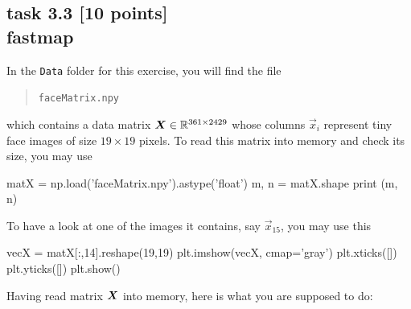 
\subsection*{task 3.3 [10 points] \\[1ex] fastmap}

In the \texttt{Data} folder for this exercise, you will find the file
\begin{quote}
    \texttt{faceMatrix.npy}
\end{quote}
which contains a data matrix $\bm{X} \in \mathbb{R}^{361 \times 2429}$ whose columns $\vec{x}_i$ represent tiny face images of size $19 \times 19$ pixels. To read this matrix into memory and check its size, you may use
\begin{python}
matX = np.load('faceMatrix.npy').astype('float')
m, n = matX.shape
print (m, n)
\end{python}
To have a look at one of the images it contains, say $\vec{x}_{15}$, you may use this
\begin{python}
vecX = matX[:,14].reshape(19,19)
plt.imshow(vecX, cmap='gray')
plt.xticks([])
plt.yticks([])
plt.show()
\end{python}
\vspace{2cm}


Having read matrix $\bm{X}$ into memory, here is what you are supposed to do:

